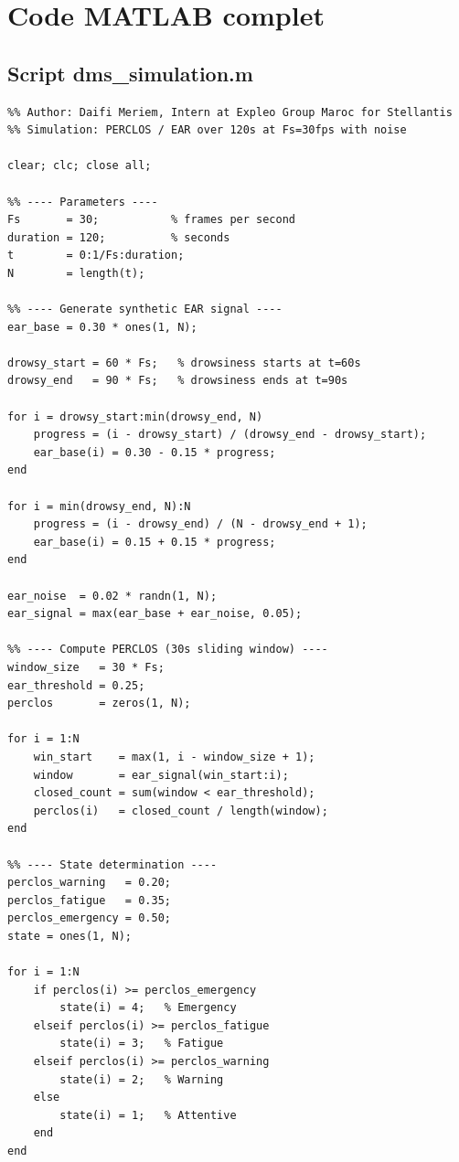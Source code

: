 \documentclass[12pt,a4paper]{report}
\begin{document}
\chapter{Code MATLAB complet}

\section{Script dms\_simulation.m}

\begin{lstlisting}[style=matlab, caption={dms\_simulation.m -- simulation compl\`ete},
  label=lst:matlab_full]
%% DMS Simulation - PERCLOS and EAR Evolution
%% Author: Daifi Meriem, Intern at Expleo Group Maroc for Stellantis
%% Simulation: PERCLOS / EAR over 120s at Fs=30fps with noise

clear; clc; close all;

%% ---- Parameters ----
Fs       = 30;           % frames per second
duration = 120;          % seconds
t        = 0:1/Fs:duration;
N        = length(t);

%% ---- Generate synthetic EAR signal ----
ear_base = 0.30 * ones(1, N);

drowsy_start = 60 * Fs;   % drowsiness starts at t=60s
drowsy_end   = 90 * Fs;   % drowsiness ends at t=90s

for i = drowsy_start:min(drowsy_end, N)
    progress = (i - drowsy_start) / (drowsy_end - drowsy_start);
    ear_base(i) = 0.30 - 0.15 * progress;
end

for i = min(drowsy_end, N):N
    progress = (i - drowsy_end) / (N - drowsy_end + 1);
    ear_base(i) = 0.15 + 0.15 * progress;
end

ear_noise  = 0.02 * randn(1, N);
ear_signal = max(ear_base + ear_noise, 0.05);

%% ---- Compute PERCLOS (30s sliding window) ----
window_size   = 30 * Fs;
ear_threshold = 0.25;
perclos       = zeros(1, N);

for i = 1:N
    win_start    = max(1, i - window_size + 1);
    window       = ear_signal(win_start:i);
    closed_count = sum(window < ear_threshold);
    perclos(i)   = closed_count / length(window);
end

%% ---- State determination ----
perclos_warning   = 0.20;
perclos_fatigue   = 0.35;
perclos_emergency = 0.50;
state = ones(1, N);

for i = 1:N
    if perclos(i) >= perclos_emergency
        state(i) = 4;   % Emergency
    elseif perclos(i) >= perclos_fatigue
        state(i) = 3;   % Fatigue
    elseif perclos(i) >= perclos_warning
        state(i) = 2;   % Warning
    else
        state(i) = 1;   % Attentive
    end
end


\end{lstlisting}
\end{document}
